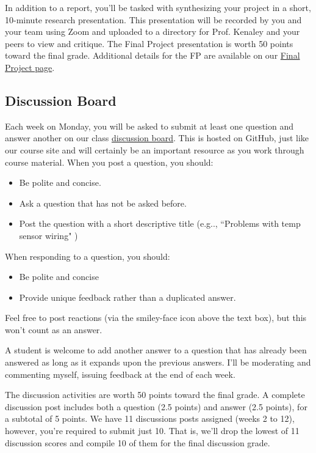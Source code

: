 \documentclass[
]{article}
\providecommand{\tightlist}{%
  \setlength{\itemsep}{0pt}\setlength{\parskip}{0pt}}
\begin{document}
In addition to a report, you'll be tasked with synthesizing your project
in a short, 10-minute research presentation. This presentation will be
recorded by you and your team using Zoom and uploaded to a directory for
Prof. Kenaley and your peers to view and critique. The Final Project
presentation is worth 50 points toward the final grade. Additional
details for the FP are available on our \href{final_project.html}{Final
Project page}.

\hypertarget{discussion-board}{%
\subsection{Discussion Board}\label{discussion-board}}

Each week on Monday, you will be asked to submit at least one question
and answer another on our class
\href{https://github.com/orgs/bcbiomech/teams/biol-5380}{discussion
board}. This is hosted on GitHub, just like our course site and will
certainly be an important resource as you work through course material.
When you post a question, you should:

\begin{itemize}
\tightlist
\item
  Be polite and concise.
\item
  Ask a question that has not be asked before.
\item
  Post the question with a short descriptive title (e.g.., ``Problems
  with temp sensor wiring" )
\end{itemize}

When responding to a question, you should:

\begin{itemize}
\tightlist
\item
  Be polite and concise
\item
  Provide unique feedback rather than a duplicated answer.
\end{itemize}

Feel free to post reactions (via the smiley-face icon above the text
box), but this won't count as an answer.

A student is welcome to add another answer to a question that has
already been answered as long as it expands upon the previous answers.
I'll be moderating and commenting myself, issuing feedback at the end of
each week.

The discussion activities are worth 50 points toward the final grade. A
complete discussion post includes both a question (2.5 points) and
answer (2.5 points), for a subtotal of 5 points. We have 11 discussions
posts assigned (weeks 2 to 12), however, you're required to submit just
10. That is, we'll drop the lowest of 11 discussion scores and compile
10 of them for the final discussion grade.
\end{document}
